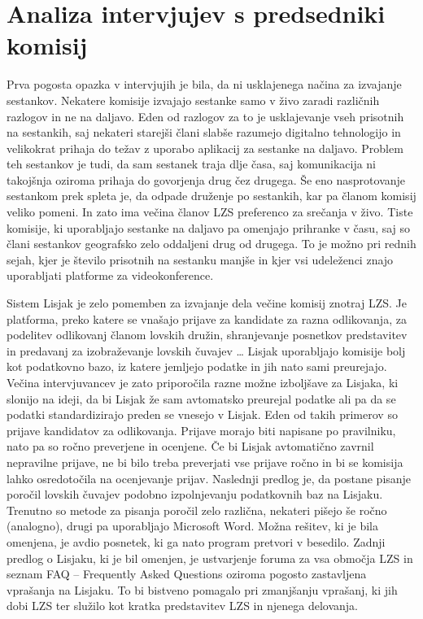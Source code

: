 \documentclass[a4paper,12pt,openright]{book}
\begin{document}
\section{Analiza intervjujev s predsedniki komisij}

Prva pogosta opazka v intervjujih je bila, da ni usklajenega načina za izvajanje sestankov. 
Nekatere komisije izvajajo sestanke samo v živo zaradi različnih razlogov in ne na daljavo. 
Eden od razlogov za to je usklajevanje vseh prisotnih na sestankih, saj nekateri starejši člani slabše razumejo digitalno tehnologijo in velikokrat prihaja do težav z uporabo aplikacij za sestanke na daljavo. 
Problem teh sestankov je tudi, da sam sestanek traja dlje časa, saj komunikacija ni takojšnja oziroma prihaja do govorjenja drug čez drugega. 
Še eno nasprotovanje sestankom prek spleta je, da odpade druženje po sestankih, kar pa članom komisij veliko pomeni. 
In zato ima večina članov LZS preferenco za srečanja v živo.
Tiste komisije, ki uporabljajo sestanke na daljavo pa omenjajo prihranke v času, saj so člani sestankov geografsko zelo oddaljeni drug od drugega. 
To je možno pri rednih sejah, kjer je število prisotnih na sestanku manjše in kjer vsi udeleženci znajo uporabljati platforme za videokonference.

Sistem Lisjak je zelo pomemben za izvajanje dela večine komisij znotraj LZS. 
Je platforma, preko katere se vnašajo prijave za kandidate za razna odlikovanja, za podelitev odlikovanj članom lovskih družin, shranjevanje posnetkov predstavitev in predavanj za izobraževanje lovskih čuvajev …
Lisjak uporabljajo komisije bolj kot podatkovno bazo, iz katere jemljejo podatke in jih nato sami preurejajo. 
Večina intervjuvancev je zato priporočila razne možne izboljšave za Lisjaka, ki slonijo na ideji, da bi Lisjak že sam avtomatsko preurejal podatke ali pa da se podatki standardizirajo preden se vnesejo v Lisjak.  
Eden od takih primerov so prijave kandidatov za odlikovanja.
Prijave morajo biti napisane po pravilniku, nato pa so ročno preverjene in ocenjene. 
Če bi Lisjak avtomatično zavrnil nepravilne prijave, ne bi bilo treba preverjati vse prijave ročno in bi se komisija lahko osredotočila na ocenjevanje prijav. 
Naslednji predlog je, da postane pisanje poročil lovskih čuvajev podobno izpolnjevanju podatkovnih baz na Lisjaku.
Trenutno so metode za pisanja poročil zelo različna, nekateri pišejo še ročno (analogno), drugi pa uporabljajo Microsoft Word.
Možna rešitev, ki je bila omenjena, je avdio posnetek, ki ga nato program pretvori v besedilo. 
Zadnji predlog o Lisjaku, ki je bil omenjen, je ustvarjenje foruma za vsa območja LZS in seznam FAQ –  Frequently Asked Questions oziroma pogosto zastavljena vprašanja na Lisjaku. 
To bi bistveno pomagalo pri zmanjšanju vprašanj, ki jih dobi LZS ter služilo kot kratka predstavitev LZS in njenega delovanja.
\end{document}
